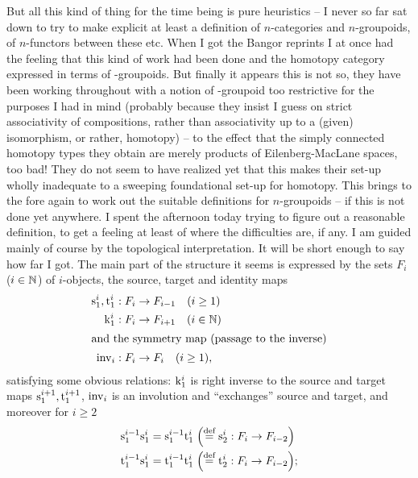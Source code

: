 But all this kind of thing for the time being is pure heuristics -- I
never so far sat down to try to make explicit at least a definition of
$n$-categories and $n$-groupoids, of $n$-functors between these
etc. When I got the Bangor reprints I at once had the feeling that
this kind of work had been done and the homotopy category
expressed in terms of \oo-groupoids. But finally it appears this is
not so, they have been working throughout with a notion of
\oo-groupoid too restrictive for the purposes I had in mind (probably
because they insist I guess on strict associativity of compositions,
rather than associativity up to a (given) isomorphism, or rather,
homotopy) -- to the effect that the simply connected homotopy types
they obtain are merely products of Eilenberg-MacLane spaces, too bad!
They do not seem to have realized yet that this makes their set-up
wholly inadequate to a sweeping foundational set-up for homotopy. This
brings to the fore again to work out the suitable definitions for
$n$-groupoids -- if this is not done yet anywhere. I spent the
afternoon today trying to figure out a reasonable definition, to get a
feeling at least of where the difficulties are, if any. I am guided
mainly of course by the topological interpretation. It will be short
enough to say how far I got. The main part of the structure it seems
is expressed by the sets $F_i$ ($i\in{\ensuremath{\mathbb{N}}}$) of $i$-objects, the source,
target and identity maps
\begin{align*}
  \mathrm{s}_1^i, \mathrm{t}_1^i &: F_i \to F_{i-1} \quad (i\ge 1) \\
  \mathrm{k}_1^i &: F_i \to F_{i+1} \quad (i\in{\ensuremath{\mathbb{N}}}) \\
\intertext{and the symmetry map (passage to the inverse)}
  \operatorname{inv}_i &: F_i \to F_i \quad (i\ge 1),
\end{align*}
satisfying some obvious relations: $\mathrm{k}_1^i$ is right inverse to
the source and target maps $\mathrm{s}_1^{i+1}, \mathrm{t}_1^{i+1}$, $\operatorname{inv}_i$
is an involution and ``exchanges'' source and target, and moreover for
$i\ge2$
\begin{align*}
  \mathrm{s}_1^{i-1} \mathrm{s}_1^i
  &= \mathrm{s}_1^{i-1} \mathrm{t}_1^i \;
    \Bigl(\overset{\textup{def}}{=} \mathrm{s}_2^i : F_i \to F_{i-2} \Bigr) \\
  \mathrm{t}_1^{i-1} \mathrm{s}_1^i
  &= \mathrm{t}_1^{i-1} \mathrm{t}_1^i \;
    \Bigl(\overset{\textup{def}}{=} \mathrm{t}_2^i : F_i \to F_{i-2} \Bigr) ;
\end{align*}
